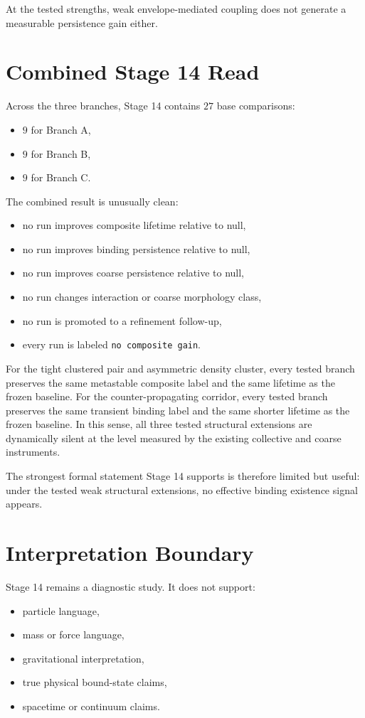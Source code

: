 \documentclass[11pt]{article}
\begin{document}
At the tested strengths, weak envelope-mediated coupling does not generate a measurable persistence gain either.

\section{Combined Stage 14 Read}

Across the three branches, Stage 14 contains $27$ base comparisons:
\begin{itemize}
\item $9$ for Branch A,
\item $9$ for Branch B,
\item $9$ for Branch C.
\end{itemize}

The combined result is unusually clean:
\begin{itemize}
\item no run improves composite lifetime relative to null,
\item no run improves binding persistence relative to null,
\item no run improves coarse persistence relative to null,
\item no run changes interaction or coarse morphology class,
\item no run is promoted to a refinement follow-up,
\item every run is labeled \texttt{no composite gain}.
\end{itemize}

For the tight clustered pair and asymmetric density cluster, every tested branch preserves the same metastable composite label and the same lifetime as the frozen baseline. For the counter-propagating corridor, every tested branch preserves the same transient binding label and the same shorter lifetime as the frozen baseline. In this sense, all three tested structural extensions are dynamically silent at the level measured by the existing collective and coarse instruments.

The strongest formal statement Stage 14 supports is therefore limited but useful: under the tested weak structural extensions, no effective binding existence signal appears.

\section{Interpretation Boundary}

Stage 14 remains a diagnostic study. It does not support:
\begin{itemize}
\item particle language,
\item mass or force language,
\item gravitational interpretation,
\item true physical bound-state claims,
\item spacetime or continuum claims.
\end{itemize}
\end{document}
